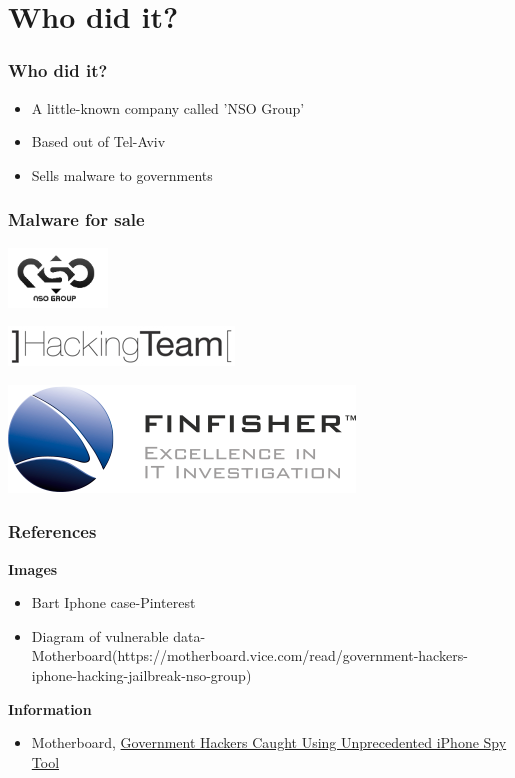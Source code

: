 \documentclass[12pt, notes]{beamer}
\begin{document}
\section{Who did it?}
\begin{frame}
	\frametitle{Who did it?}
		\begin{itemize}
			\item A little-known company called 'NSO Group'
			\item Based out of Tel-Aviv
			\item Sells malware to governments
		\end{itemize}
\end{frame}

\begin{frame}
	\frametitle{Malware for sale}
	\includegraphics[width=.3\textwidth]{nso.png}
	\begin{center}
		\includegraphics[width=.3\textwidth]{hackingteam.png}
	\end{center}
	\begin{flushright}
		\includegraphics[width=.3\textwidth]{finfisher.png}
	\end{flushright}
\end{frame}

\begin{frame}
	\frametitle{References}
	\textbf{Images}
	\begin{itemize}
		\item Bart Iphone case-Pinterest
		\item Diagram of vulnerable data-Motherboard(https://motherboard.vice.com/read/government-hackers-iphone-hacking-jailbreak-nso-group)
	\end{itemize}
	\textbf{Information}
	\begin{itemize}
		\item Motherboard, \href{https://motherboard.vice.com/read/government-hackers-iphone-hacking-jailbreak-nso-group}{Government Hackers Caught Using Unprecedented iPhone Spy Tool}
	\end{itemize}
\end{frame}
\end{document}
